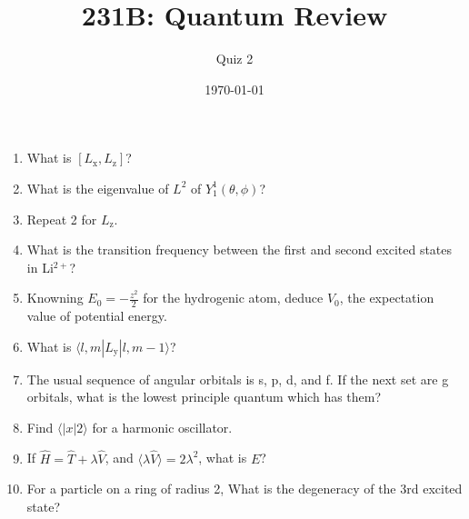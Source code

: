 




\title{231B: Quantum Review}
\author{Quiz 2}
\date{\today}
\maketitle

\begin{enumerate}
\item What is $[L_{\text{x}},L_{\text{z}}]$?

\item What is the eigenvalue of $L^2$ of $Y_1^1(\theta,\phi)$?

\item Repeat 2 for $L_{\text{z}}$.

\item What is the transition frequency between the first and second
excited states in Li$^{2+}$?

\item Knowning $E_0 = -\frac{z^2}{2}$ for the hydrogenic atom,
deduce $V_0$, the expectation value of potential energy.

\item What is $\langle l,m| L_{\text{y}} | l,m-1 \rangle$?

\item The usual sequence of angular orbitals is s, p, d, and f. If
the next set are g orbitals, what is the lowest principle quantum
which has them?

\item Find $\langle | x | 2 \rangle$ for a harmonic oscillator.

\item If $\hat{H} = \hat{T} + \lambda \hat{V}$, and
$\langle \lambda\hat{V}\rangle = 2\lambda^2$, what is $E$?

\item For a particle on a ring of radius 2, What is the degeneracy of
the 3rd excited state?

\end{enumerate}

